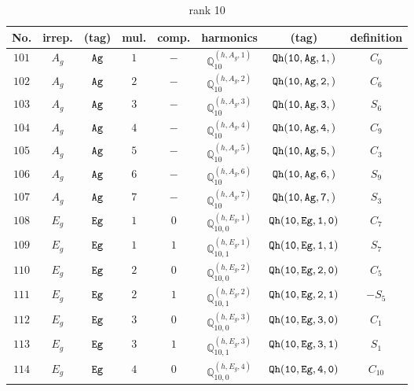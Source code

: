 \documentclass[fleqn,8pt]{jsarticle}
\begin{document}
\begin{table}[ht!]
\begin{center}
\caption{rank 10}
\renewcommand{\arraystretch}{1.3}
\begin{tabular}{cccccccc} \hline \hline
No. & irrep. & (tag) & mul. & comp. & harmonics & (tag) & definition \\ \hline
$ 101 $ & $ A_{g} $ & $ {\tt Ag} $ & $ 1 $ & $ - $ & $ \mathbb{Q}_{10}^{(h,A_{g},1)} $ & $ {\tt Qh(10,Ag,1,)} $ & $ C_{0} $ \\
$ 102 $ & $ A_{g} $ & $ {\tt Ag} $ & $ 2 $ & $ - $ & $ \mathbb{Q}_{10}^{(h,A_{g},2)} $ & $ {\tt Qh(10,Ag,2,)} $ & $ C_{6} $ \\
$ 103 $ & $ A_{g} $ & $ {\tt Ag} $ & $ 3 $ & $ - $ & $ \mathbb{Q}_{10}^{(h,A_{g},3)} $ & $ {\tt Qh(10,Ag,3,)} $ & $ S_{6} $ \\
$ 104 $ & $ A_{g} $ & $ {\tt Ag} $ & $ 4 $ & $ - $ & $ \mathbb{Q}_{10}^{(h,A_{g},4)} $ & $ {\tt Qh(10,Ag,4,)} $ & $ C_{9} $ \\
$ 105 $ & $ A_{g} $ & $ {\tt Ag} $ & $ 5 $ & $ - $ & $ \mathbb{Q}_{10}^{(h,A_{g},5)} $ & $ {\tt Qh(10,Ag,5,)} $ & $ C_{3} $ \\
$ 106 $ & $ A_{g} $ & $ {\tt Ag} $ & $ 6 $ & $ - $ & $ \mathbb{Q}_{10}^{(h,A_{g},6)} $ & $ {\tt Qh(10,Ag,6,)} $ & $ S_{9} $ \\
$ 107 $ & $ A_{g} $ & $ {\tt Ag} $ & $ 7 $ & $ - $ & $ \mathbb{Q}_{10}^{(h,A_{g},7)} $ & $ {\tt Qh(10,Ag,7,)} $ & $ S_{3} $ \\
$ 108 $ & $ E_{g} $ & $ {\tt Eg} $ & $ 1 $ & $ 0 $ & $ \mathbb{Q}_{10,0}^{(h,E_{g},1)} $ & $ {\tt Qh(10,Eg,1,0)} $ & $ C_{7} $ \\
$ 109 $ & $ E_{g} $ & $ {\tt Eg} $ & $ 1 $ & $ 1 $ & $ \mathbb{Q}_{10,1}^{(h,E_{g},1)} $ & $ {\tt Qh(10,Eg,1,1)} $ & $ S_{7} $ \\
$ 110 $ & $ E_{g} $ & $ {\tt Eg} $ & $ 2 $ & $ 0 $ & $ \mathbb{Q}_{10,0}^{(h,E_{g},2)} $ & $ {\tt Qh(10,Eg,2,0)} $ & $ C_{5} $ \\
$ 111 $ & $ E_{g} $ & $ {\tt Eg} $ & $ 2 $ & $ 1 $ & $ \mathbb{Q}_{10,1}^{(h,E_{g},2)} $ & $ {\tt Qh(10,Eg,2,1)} $ & $ - S_{5} $ \\
$ 112 $ & $ E_{g} $ & $ {\tt Eg} $ & $ 3 $ & $ 0 $ & $ \mathbb{Q}_{10,0}^{(h,E_{g},3)} $ & $ {\tt Qh(10,Eg,3,0)} $ & $ C_{1} $ \\
$ 113 $ & $ E_{g} $ & $ {\tt Eg} $ & $ 3 $ & $ 1 $ & $ \mathbb{Q}_{10,1}^{(h,E_{g},3)} $ & $ {\tt Qh(10,Eg,3,1)} $ & $ S_{1} $ \\
$ 114 $ & $ E_{g} $ & $ {\tt Eg} $ & $ 4 $ & $ 0 $ & $ \mathbb{Q}_{10,0}^{(h,E_{g},4)} $ & $ {\tt Qh(10,Eg,4,0)} $ & $ C_{10} $ \\

\end{tabular}
\end{center}
\end{table}
\end{document}
